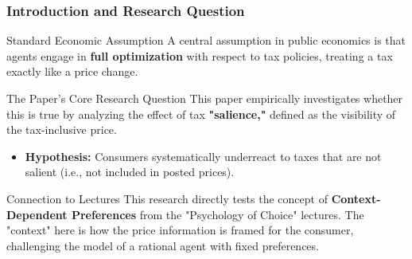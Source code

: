 \documentclass{beamer}
\begin{document}
\begin{frame}
\frametitle{ Introduction and Research Question}

\begin{block}{Standard Economic Assumption}
A central assumption in public economics is that agents engage in \textbf{full optimization} with respect to tax policies, treating a tax exactly like a price change.
\end{block}

\begin{alertblock}{The Paper's Core Research Question}
This paper empirically investigates whether this is true by analyzing the effect of tax \textbf{"salience,"} defined as the visibility of the tax-inclusive price.
\begin{itemize}
    \item \textbf{Hypothesis:} Consumers systematically underreact to taxes that are not salient (i.e., not included in posted prices).
\end{itemize}
\end{alertblock}

\begin{exampleblock}{Connection to Lectures}
This research directly tests the concept of \textbf{Context-Dependent Preferences} from the "Psychology of Choice" lectures. The "context" here is how the price information is framed for the consumer, challenging the model of a rational agent with fixed preferences.
\end{exampleblock}

\end{frame}
\end{document}
